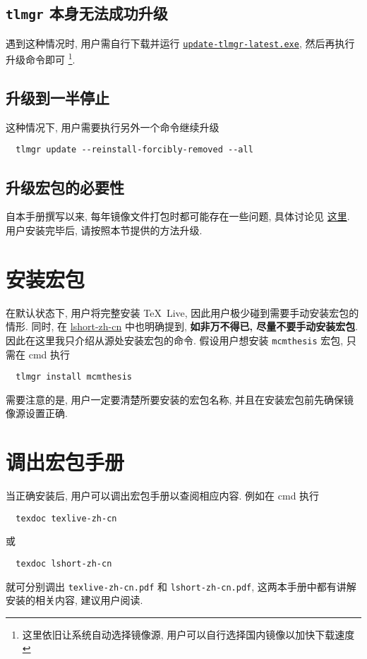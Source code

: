 \subsection{\texttt{tlmgr} 本身无法成功升级}

遇到这种情况时, 用户需自行下载并运行
\href{https://mirrors.ctan.org/systems/texlive/tlnet/update-tlmgr-latest.exe}{\texttt{update-tlmgr-latest.exe}},
然后再执行升级命令即可%
\footnote{这里依旧让系统自动选择镜像源,
用户可以自行选择国内镜像以加快下载速度}. 

\subsection{升级到一半停止}

这种情况下, 用户需要执行另外一个命令继续升级
\begin{lstlisting}
  tlmgr update --reinstall-forcibly-removed --all
\end{lstlisting}

\subsection{升级宏包的必要性}

自本手册撰写以来,
每年镜像文件打包时都可能存在一些问题,
具体讨论见%
\href{https://github.com/CTeX-org/ctex-kit/issues/569}{这里}.
用户安装完毕后,
请按照本节提供的方法升级.

\section{安装宏包}

在默认状态下, 用户将完整安装 \TeX~Live, 因此用户极少碰到需要手动安装宏包的情形. 
同时, 在
\href{http://mirrors.ctan.org/info/lshort/chinese/lshort-zh-cn.pdf}{\textsf{lshort-zh-cn}}
中也明确提到, \textbf{如非万不得已, 尽量不要手动安装宏包}. 
因此在这里我只介绍从源处安装宏包的命令. 
假设用户想安装 \texttt{mcmthesis} 宏包, 只需在 \textsf{cmd} 执行
\begin{lstlisting}
  tlmgr install mcmthesis
\end{lstlisting}
需要注意的是, 用户一定要清楚所要安装的宏包名称, 并且在安装宏包前先确保镜像源设置正确.

\section{调出宏包手册}

当正确安装后,
用户可以调出宏包手册以查阅相应内容.
例如在 \textsf{cmd} 执行
\begin{lstlisting}
  texdoc texlive-zh-cn
\end{lstlisting}
或
\begin{lstlisting}
  texdoc lshort-zh-cn
\end{lstlisting}
就可分别调出 \texttt{texlive-zh-cn.pdf} 和 \texttt{lshort-zh-cn.pdf},
这两本手册中都有讲解安装的相关内容,
建议用户阅读.

